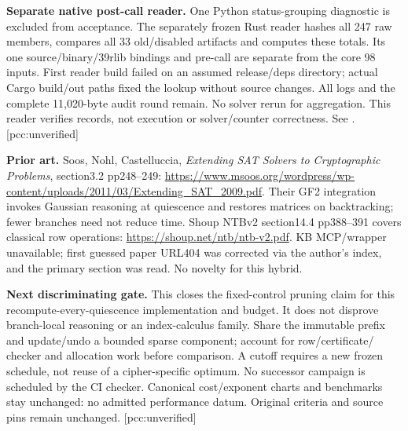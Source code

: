 \documentclass[10pt]{article}
\begin{document}
\textbf{Separate native post-call reader.} One Python status-grouping
diagnostic is excluded from acceptance. The separately frozen Rust reader
hashes all 247 raw members, compares all 33 old/disabled artifacts and computes
these totals. Its one source/binary/39rlib bindings and pre-call are separate
from the core 98 inputs. First reader build failed on an assumed release/deps
directory; actual Cargo build/out paths fixed the lookup without source changes.
All logs and the complete 11,020-byte audit round remain. No solver rerun for
aggregation. This reader verifies records, not execution or solver/counter
correctness. See . [pcc:unverified]

\textbf{Prior art.} Soos, Nohl, Castelluccia, \emph{Extending SAT Solvers to
Cryptographic Problems}, section3.2 pp248--249:
\url{https://www.msoos.org/wordpress/wp-content/uploads/2011/03/Extending_SAT_2009.pdf}.
Their GF2 integration invokes Gaussian reasoning at quiescence and restores
matrices on backtracking; fewer branches need not reduce time. Shoup NTBv2
section14.4 pp388--391 covers classical row operations:
\url{https://shoup.net/ntb/ntb-v2.pdf}.
KB MCP/wrapper unavailable; first guessed paper URL404 was corrected via the
author's index, and the primary section was read. No novelty for this hybrid.

\textbf{Next discriminating gate.} This closes the fixed-control pruning claim
for this recompute-every-quiescence implementation and budget. It does not
disprove branch-local reasoning or an index-calculus family. Share the immutable
prefix and update/undo a bounded sparse component; account for row/certificate/
checker and allocation work before comparison. A cutoff requires a new frozen
schedule, not reuse of a cipher-specific optimum. No successor campaign is
scheduled by the CI checker. Canonical cost/exponent charts and benchmarks stay
unchanged: no admitted performance datum. Original criteria and source pins
remain unchanged. [pcc:unverified]
\end{document}
